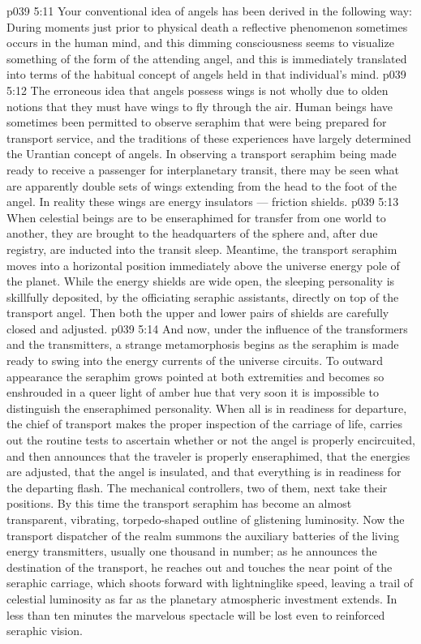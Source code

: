 \vs p039 5:11 \pc Your conventional idea of angels has been derived in the following way: During moments just prior to physical death a reflective phenomenon sometimes occurs in the human mind, and this dimming consciousness seems to visualize something of the form of the attending angel, and this is immediately translated into terms of the habitual concept of angels held in that individual’s mind.
\vs p039 5:12 The erroneous idea that angels possess wings is not wholly due to olden notions that they must have wings to fly through the air. Human beings have sometimes been permitted to observe seraphim that were being prepared for transport service, and the traditions of these experiences have largely determined the Urantian concept of angels. In observing a transport seraphim being made ready to receive a passenger for interplanetary transit, there may be seen what are apparently double sets of wings extending from the head to the foot of the angel. In reality these wings are energy insulators --- friction shields.
\vs p039 5:13 \pc When celestial beings are to be enseraphimed for transfer from one world to another, they are brought to the headquarters of the sphere and, after due registry, are inducted into the transit sleep. Meantime, the transport seraphim moves into a horizontal position immediately above the universe energy pole of the planet. While the energy shields are wide open, the sleeping personality is skillfully deposited, by the officiating seraphic assistants, directly on top of the transport angel. Then both the upper and lower pairs of shields are carefully closed and adjusted.
\vs p039 5:14 And now, under the influence of the transformers and the transmitters, a strange metamorphosis begins as the seraphim is made ready to swing into the energy currents of the universe circuits. To outward appearance the seraphim grows pointed at both extremities and becomes so enshrouded in a queer light of amber hue that very soon it is impossible to distinguish the enseraphimed personality. When all is in readiness for departure, the chief of transport makes the proper inspection of the carriage of life, carries out the routine tests to ascertain whether or not the angel is properly encircuited, and then announces that the traveler is properly enseraphimed, that the energies are adjusted, that the angel is insulated, and that everything is in readiness for the departing flash. The mechanical controllers, two of them, next take their positions. By this time the transport seraphim has become an almost transparent, vibrating, torpedo\hyp{}shaped outline of glistening luminosity. Now the transport dispatcher of the realm summons the auxiliary batteries of the living energy transmitters, usually one thousand in number; as he announces the destination of the transport, he reaches out and touches the near point of the seraphic carriage, which shoots forward with lightninglike speed, leaving a trail of celestial luminosity as far as the planetary atmospheric investment extends. In less than ten minutes the marvelous spectacle will be lost even to reinforced seraphic vision.
